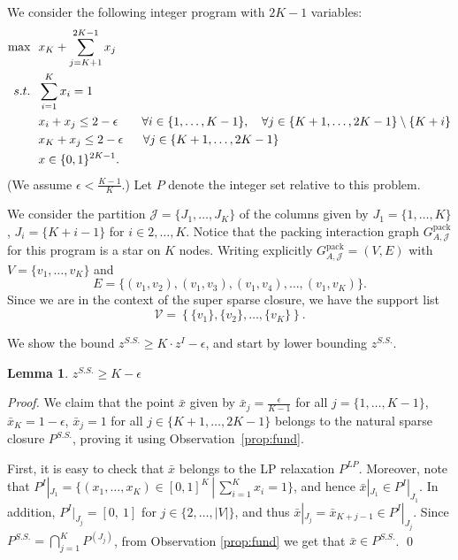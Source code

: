 \documentclass[smallextended]{svjour3}
\newtheorem{lemma}[proposition]{Lemma}
\begin{document}
	We consider the following integer program with $2 K  - 1$ variables:
\begin{align}
\textup{max}~~& x_{K} + \sum_{j = K + 1}^{2K - 1} x_{j} \notag\\
s.t.~~&  \sum_{i = 1}^{K} x_i = 1 \label{eq:firstIPcons}\\
		  & x_i + x_j \leq 2 - \epsilon  ~~~~~~\forall i \in \{1, \dots, K - 1\}, ~~~\forall j \in \{K + 1, \dots, 2K-1\}\setminus \{K + i\} \label{eq:othercons}\\
			& x_{K} + x_j \leq 2 - \epsilon  ~~~~~\forall j \in \{K + 1, \dots, 2K -1\} \label{eq:lastIPcons}\\
			& x \in \{0,1\}^{2K - 1}.\notag
\end{align} 
 (We assume $\epsilon < \frac{K-1}{K}$.) Let $P$ denote the integer set relative to this problem.
 
 We consider the partition ${\mathcal{J}} = \{J_1, \ldots, J_{K}\}$ of the columns given by $J_1 = \{1, \dots, K\}$, $J_i = \{K + i - 1\}$ for $i \in 2, \dots, K$. Notice that the packing interaction graph ${G^{\textrm{pack}}_{A, {\mathcal{J}}}}$ for this program is a star on $K$ nodes. Writing explicitly ${G^{\textrm{pack}}_{A, {\mathcal{J}}}} = (V,E)$ with $V = \{v_1, \dots, v_{K}\}$ and $$E= \{ (v_1, v_2), (v_1, v_3), (v_1, v_4) , \dots, (v_1, v_{K}) \}.$$ Since we are in the context of the super sparse closure, we have the support list $$\mathcal{V} = \left\{\{v_1\}, \{v_2\}, \dots, \{v_{K}\}\right\}.$$ 

	We show the bound $z^{S.S.} \ge K \cdot z^I - \epsilon$, and start by lower bounding $z^{S.S.}$.
	
	\begin{lemma}
		$z^{S.S.} \geq K  - \epsilon$
	\end{lemma}
	
	\begin{proof}
	We claim that the point $\bar{x}$ given by $\bar{x}_j = \frac{\epsilon}{K - 1}$ for all $j = \{1, \dots, K - 1\}$, $\bar{x}_{K} = 1 - \epsilon$, $\bar{x}_{j} = 1$ for all $j \in \{K + 1, \dots, 2K - 1\}$ belongs to the natural sparse closure $P^{S.S.}$, proving it using Observation~\ref{prop:fund}.
	
	First, it is easy to check that $\bar{x}$ belongs to the LP relaxation $P^{LP}$. Moreover, note that $P^I|_{J_1} = \{(x_1, \dots, x_{K}) \in [0,1]^K \,|\, \sum_{i = 1}^{K} x_i = 1\}$, 
and hence $\bar{x}|_{J_1} \in P^I|_{J_1}$. In addition, $P^I|_{J_j} = [0, \ 1]$ for $j \in \{2, \dots, |V|\}$, and thus $\bar{x}|_{J_j} = \bar{x}_{K + j-1} \in P^I|_{J_j}$. Since $P^{S.S.} = \bigcap_{j = 1}^K P^{(J_j)}$, from Observation \ref{prop:fund} we get that $\bar{x} \in P^{S.S.}$.{
\ifmp
	\hfill \qed
\fi
}
	\end{proof}
\end{document}
